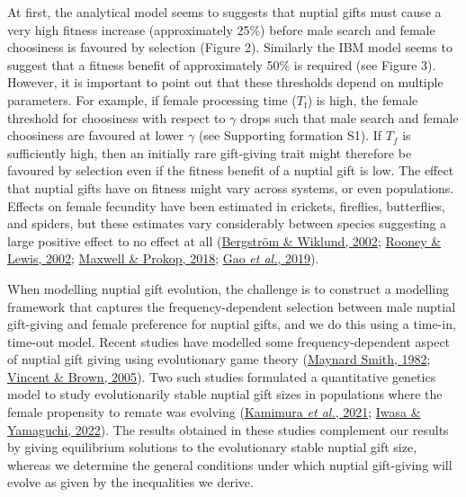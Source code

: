 \documentclass[
]{article}
\begin{document}
At first, the analytical model seems to suggests that nuptial gifts must
cause a very high fitness increase (approximately 25\%) before male
search and female choosiness is favoured by selection (Figure 2).
Similarly the IBM model seems to suggest that a fitness benefit of
approximately 50\% is required (see Figure 3). However, it is important
to point out that these thresholds depend on multiple parameters. For
example, if female processing time (\(T_{\mathrm{f}}\)) is high, the
female threshold for choosiness with respect to \(\gamma\) drops such
that male search and female choosiness are favoured at lower \(\gamma\)
(see Supporting formation S1). If \(T_{f}\) is sufficiently high, then
an initially rare gift-giving trait might therefore be favoured by
selection even if the fitness benefit of a nuptial gift is low. The
effect that nuptial gifts have on fitness might vary across systems, or
even populations. Effects on female fecundity have been estimated in
crickets, fireflies, butterflies, and spiders, but these estimates vary
considerably between species suggesting a large positive effect to no
effect at all (\protect\hyperlink{ref-Bergstrom2002}{Bergström \&
Wiklund, 2002}; \protect\hyperlink{ref-Rooney2002}{Rooney \& Lewis,
2002}; \protect\hyperlink{ref-Maxwell2018}{Maxwell \& Prokop, 2018};
\protect\hyperlink{ref-Gao2019}{Gao \emph{et al.}, 2019}).

When modelling nuptial gift evolution, the challenge is to construct a
modelling framework that captures the frequency-dependent selection
between male nuptial gift-giving and female preference for nuptial
gifts, and we do this using a time-in, time-out model. Recent studies
have modelled some frequency-dependent aspect of nuptial gift giving
using evolutionary game theory
(\protect\hyperlink{ref-MaynardSmith1982}{Maynard Smith, 1982};
\protect\hyperlink{ref-Vincent2005}{Vincent \& Brown, 2005}). Two such
studies formulated a quantitative genetics model to study evolutionarily
stable nuptial gift sizes in populations where the female propensity to
remate was evolving (\protect\hyperlink{ref-Kamimura2021}{Kamimura
\emph{et al.}, 2021}; \protect\hyperlink{ref-Iwasa2022}{Iwasa \&
Yamaguchi, 2022}). The results obtained in these studies complement our
results by giving equilibrium solutions to the evolutionary stable
nuptial gift size, whereas we determine the general conditions under
which nuptial gift-giving will evolve as given by the inequalities we
derive.
\end{document}
